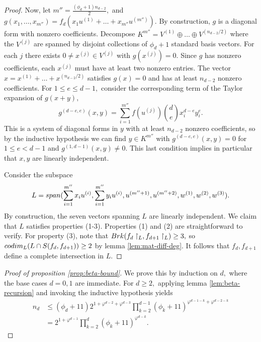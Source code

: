 \documentclass[10pt,a4paper]{amsart}
\theoremstyle{definition}
\renewcommand{\sp}{\textnormal{span}}
\newcommand{\codim}{\textnormal{codim}}
\newcommand{\brk}{\textnormal{Brk}}
\begin{document}
\begin{proof}
        Now, let $m'' = \frac{(\phi_d+1)n_{d-2}}{2},$ and  $g(x_1,\ldots,x_{m''}) = f_d(x_1u^{(1)}+\ldots+x_{m''}u^{(m'')}).$ By construction, $g$ is a diagonal form with nonzero coefficients. Decompose $K^{m''} = V^{(1)}\oplus\ldots\oplus V^{(n_{d-2}/2)}$ where the $V^{(j)}$ are spanned by disjoint collections of $\phi_d+1$ standard basis vectors. For each $j$ there exists $0\neq x^{(j)}\in V^{(j)}$ with $g(x^{(j)}) = 0.$ Since $g$ has nonzero coefficients, each $x^{(j)}$ must have at least two nonzero entries. The vector $x = x^{(1)}+\ldots+x^{(n_{d-2}/2)}$ satisfies $g(x) = 0$ and has at least $n_{d-2}$ nonzero coefficients. For $1\le e\le d-1,$ consider the corresponding term of the Taylor expansion of $g(x+y),$
        \[
        g^{(d-e,e)}(x,y) =   \sum_{i=1}^{m''} f(u^{(j)}) \binom{d}{e} x_i^{d-e} y_i^e.
        \]
        This is a system of diagonal forms in $y$ with at least $n_{d-2}$ nonzero coefficients, so by the inductive hypothesis we can find $y\in K^{m''}$ with $g^{(d-e,e)}(x,y)  = 0$ for $1\le e< d-1$ and $g^{(1,d-1)} (x,y) \neq 0.$ This last condition implies in particular that $x,y$ are linearly independent. 

        Consider the subspace
        \[
        L = \sp(\sum_{i=1}^{m''}x_iu^{(i)}, \sum_{i=1}^{m''}y_iu^{(i)},u^{(m''+1)}, u^{(m''+2)}, w^{(1)},w^{(2)},w^{(3)}).
        \]
        By construction, the seven vectors spanning $L$ are linearly independent. We claim that $L$
        satisfies properties (1-3). Properties  (1) and (2) are straightforward to verify. For property (3), note that $\brk(f_d\restriction_L, f_{d+1}\restriction_L) \ge 3,$ so  $\codim_L (L\cap S(f_d,f_{d+1})) \ge 2$ by lemma \ref{lem:mat-diff-deg}. It follows that $f_d,f_{d+1}$ define a complete intersection in $L.$ 
    \end{proof}

    \begin{proof}[Proof of proposition \ref{prop:beta-bound}]
        
        We prove this by induction on $d,$ where the base cases $d=0,1$ are immediate. For $d\ge 2,$ applying lemma \ref{lem:beta-recursion} and invoking the inductive hypothesis yields
        \begin{align*}
            n_d &\le (\phi_d+11)2^{1+\varphi^{d-2}+\varphi^{d-3}} \prod_{k=2}^{d-1} (\phi_k+11)^{\varphi^{d-1-k}+\varphi^{d-2-k}} \\
            &= 2^{1+\varphi^{d-1}} \prod_{k=2}^d (\phi_k+11)^{\varphi^{d-k}}.
        \end{align*}
    \end{proof}
\end{document}
